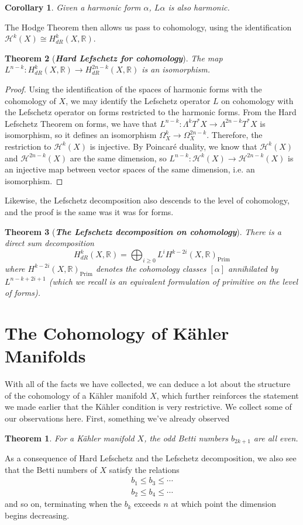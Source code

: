 \documentclass[psamsfonts, 12pt]{amsart}
\newtheorem{thm}{Theorem}[section]
\newtheorem*{thm*}{Theorem}
\newtheorem{cor}[thm]{Corollary}
\theoremstyle{definition}
\theoremstyle{remark}
\newcommand{\R}{\mathbb{R}}
\newcommand{\ib}[1]{\textbf{\textit{#1}}}
\begin{document}
%
\begin{cor}
Given a harmonic form $\alpha$, $L\alpha$ is also harmonic.
\end{cor}
%
The Hodge Theorem then allows us pass to cohomology, using the identification
$\mathcal{H}^k(X) \cong H^k_{dR}(X,\R)$.
%
\begin{thm}[\ib{Hard Lefschetz for cohomology}]
The map $L^{n-k} : H^k_{dR}(X,\R) \to H^{2n-k}_{dR}(X,\R)$ is an isomorphism.
\end{thm}
%
\begin{proof}
Using the identification of the spaces of harmonic forms with the cohomology of $X$,
we may identify the Lefschetz operator $L$ on cohomology with the Lefschetz operator
on forms restricted to the harmonic forms. From the Hard Lefschetz Theorem on
forms, we have that $L^{n-k} : \Lambda^kT^*X \to \Lambda^{2n-k}T^*X$ is isomorphism,
so it defines an isomorphism $\Omega^k_X \to \Omega^{2n-k}_X$. Therefore, the
restriction to $\mathcal{H}^k(X)$ is injective. By Poincar\'e duality, we know
that $\mathcal{H}^k(X)$ and $\mathcal{H}^{2n-k}(X)$ are the same dimension, so
$L^{n-k} : \mathcal{H}^k(X) \to \mathcal{H}^{2n-k}(X)$ is an injective map between
vector spaces of the same dimension, i.e. an isomorphism.
\end{proof}
%
Likewise, the Lefschetz decomposition also descends to the level of cohomology, and the
proof is the same was it was for forms.
%
\begin{thm}[\ib{The Lefschetz decomposition on cohomology}]
There is a direct sum decomposition
\[
H^k_{dR}(X,\R) = \bigoplus_{i \geq 0}L^iH^{k-2i}(X,\R)_{\mathrm{Prim}}
\]
where $H^{k-2i}(X,\R)_{\mathrm{Prim}}$ denotes the cohomology classes $[\alpha]$
annihilated by $L^{n-k+2i+1}$ (which we recall is an equivalent formulation of
primitive on the level of forms).
\end{thm}
%
\section{The Cohomology of K\"ahler Manifolds}
%

With all of the facts we have collected, we can deduce a lot about the structure of
the cohomology of a K\"ahler manifold $X$, which further reinforces the statement we
made earlier that the K\"ahler condition is very restrictive. We collect some of
our observations here. First, something we've already observed
%
\begin{thm*}
For a K\"ahler manifold $X$, the odd Betti numbers $b_{2k+1}$ are all even.
\end{thm*}
%
As a consequence of Hard Lefschetz and the Lefschetz decomposition, we also see that
the Betti numbers of $X$ satisfy the relations
\begin{align*}
b_1 \leq b_3 \leq \cdots \\
b_2 \leq b_4 \leq \cdots
\end{align*}
and so on, terminating when the $b_k$ exceeds $n$ at which point the dimension begins
decreasing. \\
\end{document}
